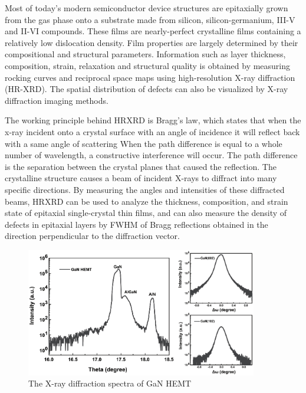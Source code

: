 Most of today’s modern semiconductor device structures are epitaxially grown from the gas phase onto a substrate made from silicon, silicon-germanium, III-V and II-VI compounds. These films are nearly-perfect crystalline films containing a relatively low dislocation density. Film properties are largely determined by their compositional and structural parameters. Information such as layer thickness, composition, strain, relaxation and structural quality is obtained by measuring rocking curves and reciprocal space maps using high-resolution X-ray  diffraction (HR-XRD). The spatial distribution of defects can also be visualized by X-ray diffraction imaging methods.

The working principle behind HRXRD is  Bragg’s law, which states that when the x-ray incident onto a crystal surface with an angle of incidence it will reflect back with a same angle of scattering When the path difference is equal to a whole number of wavelength, a constructive interference will occur. The path difference is the separation between the crystal  planes that caused the reflection. The crystalline structure causes a beam of incident X-rays to diffract into many specific directions. By measuring the angles and intensities of these diffracted beams, HRXRD can be used to analyze the thickness, composition, and strain state of epitaxial single-crystal thin films, and can also measure the density of defects in epitaxial layers by FWHM of Bragg reflections obtained in the direction perpendicular to the diffraction vector.

\begin{figure}[ht] 
\centering    
\includegraphics[width=0.9\textwidth]{xrdhemt}
\caption[The X-ray diffraction spectra of GaN HEMT]{The X-ray diffraction spectra of GaN HEMT}
\label{fig:xrdhemt}
\end{figure}

